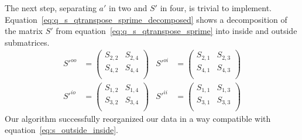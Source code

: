 The next step, separating $a'$ in two and $S'$ in four, is trivial to implement.
Equation~\eqref{eq:q_s_qtranspose_sprime_decomposed} shows a decomposition of the matrix $S'$ from equation~\eqref{eq:q_s_qtranspose_sprime} into inside and outside submatrices.
\begin{equation}
    \begin{aligned}
    S'^{oo}
    &=
    \begin{pmatrix}
        S_{2,2} & S_{2,4}  \\
        S_{4,2} & S_{4,4}  \\
    \end{pmatrix}
    &
    S'^{oi}
    &=
    \begin{pmatrix}
        S_{2,1} & S_{2,3}  \\
        S_{4,1} & S_{4,3}  \\
    \end{pmatrix}
    \\
    S'^{io}
    &=
    \begin{pmatrix}
        S_{1,2} & S_{1,4}  \\
        S_{3,2} & S_{3,4}  \\
    \end{pmatrix}
    &
    S'^{ii}
    &=
    \begin{pmatrix}
        S_{1,1} & S_{1,3}  \\
        S_{3,1} & S_{3,3}  \\
    \end{pmatrix}
    \end{aligned}
    \label{eq:q_s_qtranspose_sprime_decomposed}
\end{equation}
Our algorithm successfully reorganized our data in a way compatible with equation~\eqref{eq:s_outside_inside}.

